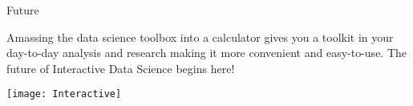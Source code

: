 \documentclass[ignorenonframetext,]{beamer}
\begin{document}
\begin{frame}{Future}

Amassing the data science toolbox into a calculator gives you a toolkit
in your day-to-day analysis and research making it more convenient and
easy-to-use. The future of Interactive Data Science begins here!

\begin{center}\texttt{[image: Interactive]} \end{center}

\end{frame}
\end{document}
